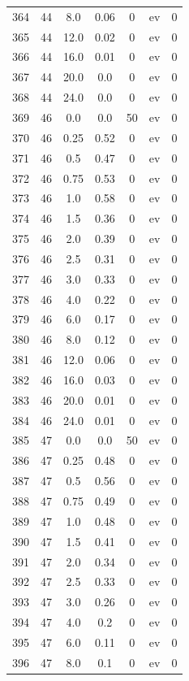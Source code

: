 \documentclass[12pt,a4paper]{article}
\begin{document}
\begin{tabular}{r|cccccc}
	364 & 44 & 8.0 & 0.06 & 0 & ev & 0 \\
	365 & 44 & 12.0 & 0.02 & 0 & ev & 0 \\
	366 & 44 & 16.0 & 0.01 & 0 & ev & 0 \\
	367 & 44 & 20.0 & 0.0 & 0 & ev & 0 \\
	368 & 44 & 24.0 & 0.0 & 0 & ev & 0 \\
	369 & 46 & 0.0 & 0.0 & 50 & ev & 0 \\
	370 & 46 & 0.25 & 0.52 & 0 & ev & 0 \\
	371 & 46 & 0.5 & 0.47 & 0 & ev & 0 \\
	372 & 46 & 0.75 & 0.53 & 0 & ev & 0 \\
	373 & 46 & 1.0 & 0.58 & 0 & ev & 0 \\
	374 & 46 & 1.5 & 0.36 & 0 & ev & 0 \\
	375 & 46 & 2.0 & 0.39 & 0 & ev & 0 \\
	376 & 46 & 2.5 & 0.31 & 0 & ev & 0 \\
	377 & 46 & 3.0 & 0.33 & 0 & ev & 0 \\
	378 & 46 & 4.0 & 0.22 & 0 & ev & 0 \\
	379 & 46 & 6.0 & 0.17 & 0 & ev & 0 \\
	380 & 46 & 8.0 & 0.12 & 0 & ev & 0 \\
	381 & 46 & 12.0 & 0.06 & 0 & ev & 0 \\
	382 & 46 & 16.0 & 0.03 & 0 & ev & 0 \\
	383 & 46 & 20.0 & 0.01 & 0 & ev & 0 \\
	384 & 46 & 24.0 & 0.01 & 0 & ev & 0 \\
	385 & 47 & 0.0 & 0.0 & 50 & ev & 0 \\
	386 & 47 & 0.25 & 0.48 & 0 & ev & 0 \\
	387 & 47 & 0.5 & 0.56 & 0 & ev & 0 \\
	388 & 47 & 0.75 & 0.49 & 0 & ev & 0 \\
	389 & 47 & 1.0 & 0.48 & 0 & ev & 0 \\
	390 & 47 & 1.5 & 0.41 & 0 & ev & 0 \\
	391 & 47 & 2.0 & 0.34 & 0 & ev & 0 \\
	392 & 47 & 2.5 & 0.33 & 0 & ev & 0 \\
	393 & 47 & 3.0 & 0.26 & 0 & ev & 0 \\
	394 & 47 & 4.0 & 0.2 & 0 & ev & 0 \\
	395 & 47 & 6.0 & 0.11 & 0 & ev & 0 \\
	396 & 47 & 8.0 & 0.1 & 0 & ev & 0 \\

\end{tabular}
\end{document}

